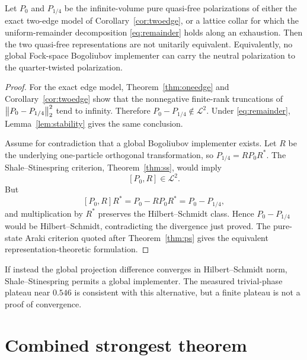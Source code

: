\begin{theorem}
\label{thm:nonimpl}
Let $P_0$ and $P_{1/4}$ be the infinite-volume pure quasi-free
polarizations of either the exact two-edge model of
Corollary~\ref{cor:twoedge}, or a lattice collar for which the
uniform-remainder decomposition \eqref{eq:remainder} holds along an
exhaustion.  Then the two quasi-free representations are not unitarily
equivalent.  Equivalently, no global Fock-space Bogoliubov implementer
can carry the neutral polarization to the quarter-twisted polarization.
\end{theorem}

\begin{proof}
For the exact edge model, Theorem~\ref{thm:oneedge} and
Corollary~\ref{cor:twoedge} show that the nonnegative finite-rank
truncations of $\left\lVert P_0-P_{1/4}\right\rVert_2^2$ tend to infinity.  Therefore
$P_0-P_{1/4}\notin\mathcal L^2$.  Under
\eqref{eq:remainder}, Lemma~\ref{lem:stability} gives the same conclusion.

Assume for contradiction that a global Bogoliubov implementer exists.
Let $R$ be the underlying one-particle orthogonal transformation, so
$P_{1/4}=RP_0R^*$.  The Shale--Stinespring criterion,
Theorem~\ref{thm:ss}, would imply
\[
 [P_0,R]\in\mathcal L^2.
\]
But
\[
 [P_0,R]R^*=P_0-RP_0R^*=P_0-P_{1/4},
\]
and multiplication by $R^*$ preserves the Hilbert--Schmidt class.
Hence $P_0-P_{1/4}$ would be Hilbert--Schmidt, contradicting the
divergence just proved.  The pure-state Araki criterion quoted after
Theorem~\ref{thm:ps} gives the equivalent representation-theoretic
formulation.
\end{proof}

\begin{remark}
If instead the global projection difference converges in
Hilbert--Schmidt norm, Shale--Stinespring permits a global implementer.
The measured trivial-phase plateau near $0.546$ is consistent with this
alternative, but a finite plateau is not a proof of convergence.
\end{remark}

\section{Combined strongest theorem}

